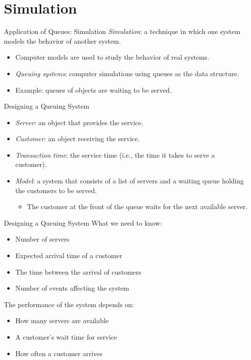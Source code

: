 \documentclass[14pt,aspectratio=1610]{beamer}
\begin{document}
\section{Simulation}

\begin{frame}{Application of Queues: Simulation}
  \emph{Simulation}: a technique in which one system models the behavior of another system.

  \begin{itemize}
  \item
    Computer models are used to study the behavior of real systems.
  \item
    \emph{Queuing systems}: computer simulations using queues as the data structure.
  \item
    Example: queues of objects are waiting to be served.
\end{itemize}
\end{frame}

\begin{frame}{Designing a Queuing System}
  
  \begin{itemize}
    \item 
      \emph{Server}: an object that provides the service.

    \item
      \emph{Customer}: an object receiving the service.

    \item
      \emph{Transaction time}: the service time (i.e., the time it takes to serve a customer).
    \item
      \emph{Model}: a system that consists of a list of servers and a waiting queue holding the customers to be served.
      \begin{itemize}
        \item
          The customer at the front of the queue waits for the next available server.
      \end{itemize}
\end{itemize}
\end{frame}

\begin{frame}{Designing a Queuing System}
  What we need to know:
  \begin{itemize}
    \item 
      Number of servers
    \item 
      Expected arrival time of a customer
    \item 
      The time between the arrival of customers
    \item 
      Number of events affecting the system
  \end{itemize}

  The performance of the system depends on:
  \begin{itemize}
    \item 
      How many servers are available
    \item 
      A customer's wait time for service
    \item 
      How often a customer arrives
  \end{itemize}
\end{frame}
\end{document}
